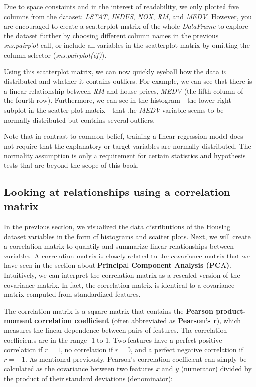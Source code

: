 \documentclass[11pt]{article}
\begin{document}
    Due to space constaints and in the interest of readability, we only
plotted five columns from the dataset: \emph{LSTAT}, \emph{INDUS},
\emph{NOX}, \emph{RM}, and \emph{MEDV}. However, you are encouraged to
create a scatterplot matrix of the whole \emph{DataFrame} to explore the
dataset further by choosing different column names in the previous
\emph{sns.pairplot} call, or include all variables in the scatterplot
matrix by omitting the column selector (\emph{sns.pairplot(df)}).

Using this scatterplot matrix, we can now quickly eyeball how the data
is distributed and whether it contains outliers. For example, we can see
that there is a linear relationship between \emph{RM} and house prices,
\emph{MEDV} (the fifth column of the fourth row). Furthermore, we can
see in the histogram - the lower-right subplot in the scatter plot
matrix - that the \emph{MEDV} variable seems to be normally distributed
but contains several outliers.

Note that in contrast to common belief, training a linear regression
model does not require that the explanatory or target variables are
normally distributed. The normality assumption is only a requirement for
certain statistics and hypothesis tests that are beyond the scope of
this book.

    \subsection{Looking at relationships using a correlation
matrix}\label{looking-at-relationships-using-a-correlation-matrix}

    In the previous section, we visualized the data distributions of the
Housing dataset variables in the form of histograms and scatter plots.
Next, we will create a correlation matrix to quantify and summarize
linear relationships between variables. A correlation matrix is closely
related to the covariance matrix that we have seen in the section about
\textbf{Principal Component Analysis (PCA)}. Intuitively, we can
interpret the correlation matrix as a rescaled version of the covariance
matrix. In fact, the correlation matrix is identical to a covariance
matrix computed from standardized features.

The correlation matrix is a square matrix that contains the
\textbf{Pearson product-moment correlation coefficient} (often
abbreviated as \textbf{Pearson's r}), which measures the linear
dependence between pairs of features. The correlation coefficients are
in the range -1 to 1. Two features have a perfect positive correlation
if \(r=1\), no correlation if \(r=0\), and a perfect negative
correlation if \(r=-1\). As mentioned previously, Pearson's correlation
coefficient can simply be calculated as the covariance between two
features \(x\) and \(y\) (numerator) divided by the product of their
standard deviations (denominator):
\end{document}
